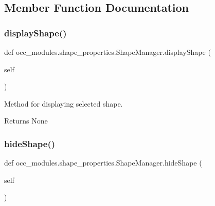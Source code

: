 \subsection{Member Function Documentation}
\hypertarget{classocc__modules_1_1shape__properties_1_1_shape_manager_aba26c11e7e7ec6c2c6709a27cbeaaf69}{}\label{classocc__modules_1_1shape__properties_1_1_shape_manager_aba26c11e7e7ec6c2c6709a27cbeaaf69} 
\subsubsection{\texorpdfstring{display\+Shape()}{displayShape()}}
{\footnotesize\ttfamily def occ\+\_\+modules.\+shape\+\_\+properties.\+Shape\+Manager.\+display\+Shape (\begin{DoxyParamCaption}\item[{}]{self }\end{DoxyParamCaption})}



Method for displaying selected shape. 

\begin{DoxyReturn}{Returns}
None 
\end{DoxyReturn}
\hypertarget{classocc__modules_1_1shape__properties_1_1_shape_manager_ad4293087adb512ea61fe0c3429c0e08c}{}\label{classocc__modules_1_1shape__properties_1_1_shape_manager_ad4293087adb512ea61fe0c3429c0e08c} 
\subsubsection{\texorpdfstring{hide\+Shape()}{hideShape()}}
{\footnotesize\ttfamily def occ\+\_\+modules.\+shape\+\_\+properties.\+Shape\+Manager.\+hide\+Shape (\begin{DoxyParamCaption}\item[{}]{self }\end{DoxyParamCaption})}



